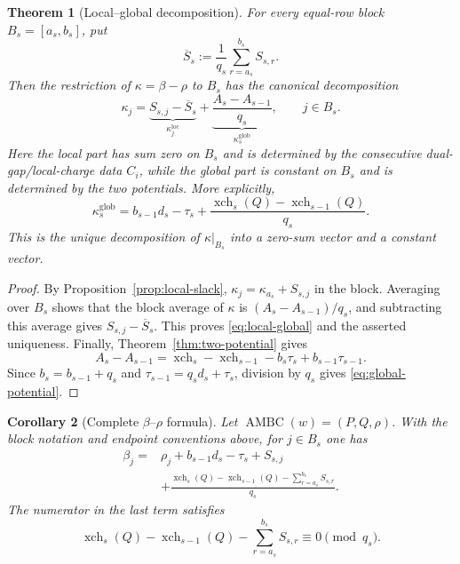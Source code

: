 \documentclass[11pt]{article}
\newtheorem{theorem}{Theorem}[section]
\newtheorem{corollary}[theorem]{Corollary}
\theoremstyle{definition}
\theoremstyle{remark}
\newcommand{\AMBC}{\operatorname{AMBC}}
\newcommand{\xch}{\operatorname{xch}}
\begin{document}
\begin{theorem}[Local--global decomposition]\label{thm:local-global}
For every equal-row block \(B_s=[a_s,b_s]\), put
\begin{equation}\label{eq:Sbar}
 \overline S_s:=\frac1{q_s}\sum_{r=a_s}^{b_s}S_{s,r}.
\end{equation}
Then the restriction of \(\kappa=\beta-\rho\) to \(B_s\) has the canonical
decomposition
\begin{equation}\label{eq:local-global}
 \kappa_j=
 \underbrace{S_{s,j}-\overline S_s}_{\displaystyle\kappa^{\mathrm{loc}}_j}
 +
 \underbrace{\frac{A_s-A_{s-1}}{q_s}}_{
             \displaystyle\kappa^{\mathrm{glob}}_s},
 \qquad j\in B_s.
\end{equation}
Here the local part has sum zero on \(B_s\) and is determined by the consecutive
dual-gap/local-charge data \(C_i\), while the global part is constant on \(B_s\) and is
determined by the two potentials.  More explicitly,
\begin{equation}\label{eq:global-potential}
 \kappa^{\mathrm{glob}}_s
 =b_{s-1}d_s-\tau_s
  +\frac{\xch_s(Q)-\xch_{s-1}(Q)}{q_s}.
\end{equation}
This is the unique decomposition of \(\kappa|_{B_s}\) into a zero-sum vector and a
constant vector.
\end{theorem}

\begin{proof}
By Proposition~\ref{prop:local-slack},
\(\kappa_j=\kappa_{a_s}+S_{s,j}\) in the block.  Averaging over \(B_s\) shows that
the block average of \(\kappa\) is \((A_s-A_{s-1})/q_s\), and subtracting this average
gives \(S_{s,j}-\overline S_s\).  This proves \eqref{eq:local-global} and the asserted
uniqueness.  Finally, Theorem~\ref{thm:two-potential} gives
\[
 A_s-A_{s-1}
 =\xch_s-\xch_{s-1}-b_s\tau_s+b_{s-1}\tau_{s-1}.
\]
Since \(b_s=b_{s-1}+q_s\) and \(\tau_{s-1}=q_sd_s+\tau_s\), division by \(q_s\)
gives \eqref{eq:global-potential}.
\end{proof}

\begin{corollary}[Complete \texorpdfstring{\(\beta\)--\(\rho\)}{beta-rho} formula]\label{cor:complete}
Let \(\AMBC(w)=(P,Q,\rho)\).  With the block notation and endpoint conventions
above, for \(j\in B_s\) one has
\begin{equation}\label{eq:complete-formula}
 \begin{aligned}
 \beta_j={}&\rho_j+b_{s-1}d_s-\tau_s+S_{s,j}\\
 &+\frac{\xch_s(Q)-\xch_{s-1}(Q)
              -\displaystyle\sum_{r=a_s}^{b_s}S_{s,r}}{q_s}.
 \end{aligned}
\end{equation}
The numerator in the last term satisfies
\begin{equation}\label{eq:divisibility}
 \xch_s(Q)-\xch_{s-1}(Q)
 -\sum_{r=a_s}^{b_s}S_{s,r}\equiv0\pmod{q_s}.
\end{equation}
\end{corollary}
\end{document}
